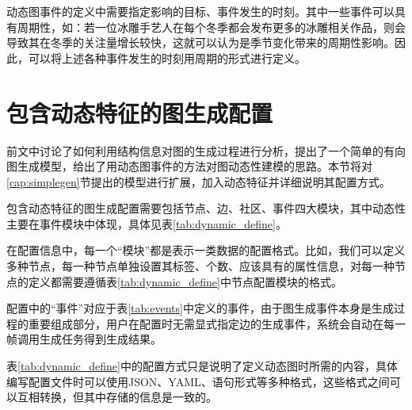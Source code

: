 动态图事件的定义中需要指定影响的目标、事件发生的时刻。其中一些事件可以具有周期性，如：若一位冰雕手艺人在每个冬季都会发布更多的冰雕相关作品，则会导致其在冬季的关注量增长较快，这就可以认为是季节变化带来的周期性影响。因此，可以将上述各种事件发生的时刻用周期的形式进行定义。

\section{包含动态特征的图生成配置}
\label{cha:generatorscheme}

前文中讨论了如何利用结构信息对图的生成过程进行分析，提出了一个简单的有向图生成模型，给出了用动态图事件的方法对图动态性建模的思路。本节将对\ref{cap:simplegen}节提出的模型进行扩展，加入动态特征并详细说明其配置方式。

包含动态特征的图生成配置需要包括节点、边、社区、事件四大模块，其中动态性主要在事件模块中体现，具体见表\ref{tab:dynamic_define}。

在配置信息中，每一个“模块”都是表示一类数据的配置格式。比如，我们可以定义多种节点，每一种节点单独设置其标签、个数、应该具有的属性信息，对每一种节点的定义都需要遵循表\ref{tab:dynamic_define}中节点配置模块的格式。

配置中的“事件”对应于表\ref{tab:events}中定义的事件，由于图生成事件本身是生成过程的重要组成部分，用户在配置时无需显式指定边的生成事件，系统会自动在每一帧调用生成任务得到生成结果。

表\ref{tab:dynamic_define}中的配置方式只是说明了定义动态图时所需的内容，具体编写配置文件时可以使用JSON、YAML、语句形式等多种格式，这些格式之间可以互相转换，但其中存储的信息是一致的。

